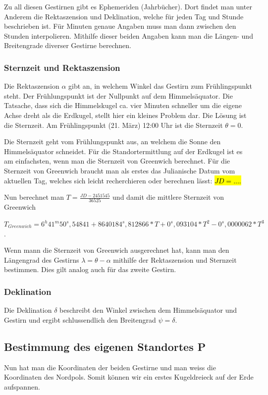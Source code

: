 \documentclass[12pt]{scrartcl}
\begin{document}
Zu all diesen Gestirnen gibt es Ephemeriden (Jahrbücher). 
Dort findet man unter Anderem die Rektaszension und  Deklination, welche für jeden Tag und Stunde beschrieben ist. Für Minuten genaue Angaben muss man dann zwischen den Stunden interpolieren.
Mithilfe dieser beiden Angaben kann man die Längen- und Breitengrade diverser Gestirne berechnen.

\subsubsection{Sternzeit und Rektaszension}
Die Rektaszension $\alpha$ gibt an, in welchem Winkel das Gestirn zum Frühlingspunkt steht. 
Der Frühlungspunkt ist der Nullpunkt auf dem Himmelsäquator. 
Die Tatsache, dass sich die Himmelskugel  ca. vier Minuten schneller um die eigene Achse dreht als die Erdkugel, stellt hier ein kleines Problem dar.
Die Lösung ist die Sternzeit. 
Am Frühlingspunkt (21. März) 12:00 Uhr ist die Sternzeit
$\theta = 0$. 
 
Die Sternzeit geht vom Frühlungspunkt aus, an welchem die Sonne den Himmelsäquator schneidet.
Für die Standortermittlung auf der Erdkugel ist es am einfachsten, wenn man die Sternzeit von Greenwich berechnet. 
Für die Sternzeit von Greenwich braucht man als erstes das Julianische Datum vom aktuellen Tag, welches sich leicht recherchieren oder berechnen lässt: \hl{$JD=....$}

Nun berechnet man $T=\frac{JD-2451545}{36525}$ und damit die mittlere Sternzeit von Greenwich

 $T_{Greenwich} = 6^h 41^m 50^s,54841 + 8640184^s,812866 * T + 0^s,093104*T^2 - 0^s,0000062 * T^3$.
 
 Wenn mann die Sternzeit von Greenwich ausgerechnet hat, kann man den Längengrad des Gestirns $\lambda = \theta - \alpha$ mithilfe der Rektaszension und Sternzeit bestimmen. 
 Dies gilt analog auch für das zweite Gestirn.
 
 \subsubsection{Deklination}
 Die Deklination $\delta$ beschreibt den Winkel zwischen dem Himmelsäquator und Gestirn und ergibt schlussendlich den Breitengrad $\psi = \delta$.
 


\subsection{Bestimmung des eigenen Standortes P}
Nun hat man die Koordinaten der beiden Gestirne und man weiss die Koordinaten des Nordpols.
Somit können wir ein erstes Kugeldreieck auf der Erde aufspannen.
\end{document}
